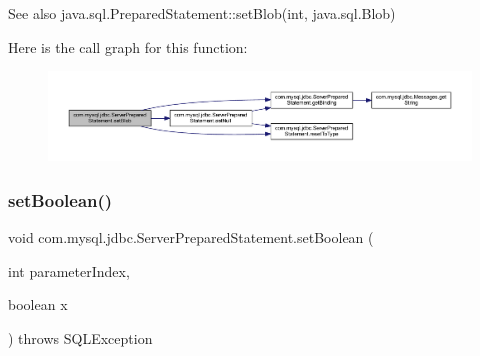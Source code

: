 \begin{DoxySeeAlso}{See also}
java.\+sql.\+Prepared\+Statement\+::set\+Blob(int, java.\+sql.\+Blob) 
\end{DoxySeeAlso}
Here is the call graph for this function\+:
\nopagebreak
\begin{figure}[H]
\begin{center}
\leavevmode
\includegraphics[width=350pt]{classcom_1_1mysql_1_1jdbc_1_1_server_prepared_statement_ac1ab0464fd52487c1de67189168331da_cgraph}
\end{center}
\end{figure}
\mbox{\label{classcom_1_1mysql_1_1jdbc_1_1_server_prepared_statement_acabde4bf63d0f89240be8697087931c8}} 
\subsubsection{\texorpdfstring{set\+Boolean()}{setBoolean()}}
{\footnotesize\ttfamily void com.\+mysql.\+jdbc.\+Server\+Prepared\+Statement.\+set\+Boolean (\begin{DoxyParamCaption}\item[{int}]{parameter\+Index,  }\item[{boolean}]{x }\end{DoxyParamCaption}) throws S\+Q\+L\+Exception}

